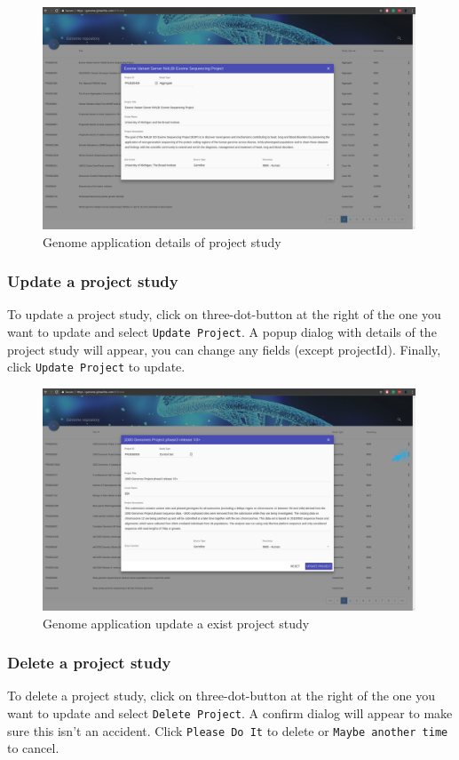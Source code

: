 \documentclass[a4paper,12pt]{article}
\begin{document}
\begin{figure}[H]
\centering
\includegraphics[width=0.99\textwidth]{images/genome-details}
\caption{Genome application details of project study}
\end{figure}

\subsubsection{Update a project study}
To update a project study, click on three-dot-button at the right of the one you want to update and select \texttt{Update Project}. A popup dialog with details of the project study will appear, you can change any fields (except projectId). Finally, click \texttt{Update Project} to update.

\begin{figure}[H]
\centering
\includegraphics[width=0.99\textwidth]{images/genome-update}
\caption{Genome application update a exist project study}
\end{figure}

\subsubsection{Delete a project study}
To delete a project study, click on three-dot-button at the right of the one you want to update and select \texttt{Delete Project}. A confirm dialog will appear to make sure this isn't an accident. Click \texttt{Please Do It} to delete or \texttt{Maybe another time} to cancel.
\end{document}
